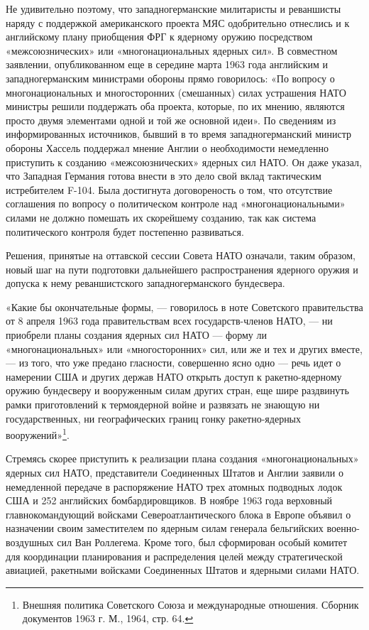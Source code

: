 \documentclass[12pt, a4paper, openany]{book}
\begin{document}
Не удивительно поэтому, что западногерманские милитаристы и реваншисты наряду с поддержкой американского проекта МЯС одобрительно отнеслись и к английскому плану приобщения ФРГ к ядерному оружию посредством «межсоюзнических» или «многонациональных ядерных сил». В совместном заявлении, опубликованном еще в середине марта 1963 года английским и западногерманским министрами обороны прямо говорилось: «По вопросу о многонациональных и многосторонних (смешанных) силах устрашения НАТО министры решили поддержать оба проекта, которые, по их мнению, являются просто двумя элементами одной и той же основной идеи». По сведениям из информированных источников, бывший в то время западногерманский министр обороны Хассель поддержал мнение Англии о необходимости немедленно приступить к созданию «межсоюзнических» ядерных сил НАТО. Он даже указал, что Западная Германия готова внести в это дело свой вклад тактическим истребителем F-104. Была достигнута договореность о том, что отсутствие соглашения по вопросу о политическом контроле над «многонациональными» силами не должно помешать их скорейшему созданию, так как система политического контроля будет постепенно развиваться.
	

Решения, принятые на оттавской сессии Совета НАТО означали, таким образом, новый шаг на пути подготовки дальнейшего распространения ядерного оружия и допуска к нему реваншистского западногерманского бундесвера.

«Какие бы окончательные формы, — говорилось в ноте Советского правительства от 8 апреля 1963 года правительствам всех государств-членов НАТО, — ни приобрели планы создания ядерных сил НАТО — форму ли «многонациональных» или «многосторонних» сил, или же и тех и других вместе, — из того, что уже предано гласности, совершенно ясно одно — речь идет о намерении США и других держав НАТО открыть доступ к ракетно-ядерному оружию бундесверу и вооруженным силам других стран, еще шире раздвинуть рамки приготовлений к термоядерной войне и развязать не знающую ни государственных, ни географических границ гонку ракетно-ядерных вооружений»{\footnote{Внешняя политика Советского Союза и международные отношения. Сборник документов 1963 г. М., 1964, стр. 64.}}.

	
	Стремясь скорее приступить к реализации плана создания «многонациональных» ядерных сил НАТО, представители Соединенных Штатов и Англии заявили о немедленной передаче в распоряжение НАТО трех атомных подводных лодок США и 252 английских бомбардировщиков. В ноябре 1963 года верховный главнокомандующий войсками Североатлантического блока в Европе объявил о назначении своим заместителем по ядерным силам генерала бельгийских военно-воздушных сил Ван Роллегема. Кроме того, был сформирован особый комитет для координации планирования и распределения целей между стратегической авиацией, ракетными войсками Соединенных Штатов и ядерными силами НАТО.
	
\end{document}

